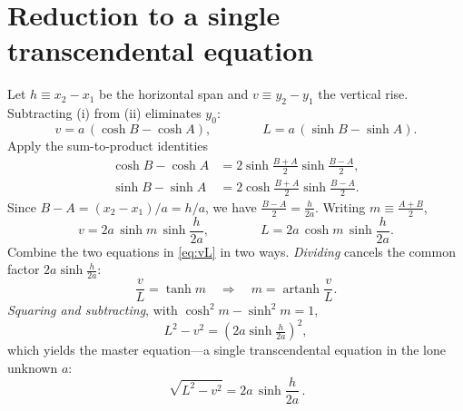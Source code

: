 \documentclass[11pt]{article}
\theoremstyle{remark}
\newcommand{\artanh}{\operatorname{artanh}}
\begin{document}
\section{Reduction to a single transcendental equation}
Let $h\equiv x_2-x_1$ be the horizontal span and $v\equiv y_2-y_1$ the vertical rise.
Subtracting (i) from (ii) eliminates $y_0$:
\begin{equation}
  v = a\,(\cosh B-\cosh A),\qquad\qquad
  L = a\,(\sinh B-\sinh A).
\end{equation}
Apply the sum-to-product identities
\begin{align}
  \cosh B-\cosh A &= 2\sinh\tfrac{B+A}{2}\sinh\tfrac{B-A}{2},\\
  \sinh B-\sinh A &= 2\cosh\tfrac{B+A}{2}\sinh\tfrac{B-A}{2}.
\end{align}
Since $B-A=(x_2-x_1)/a=h/a$, we have $\tfrac{B-A}{2}=\tfrac{h}{2a}$. Writing
$m\equiv\tfrac{A+B}{2}$,
\begin{equation}
  v = 2a\,\sinh m\,\sinh\frac{h}{2a},
  \qquad\qquad
  L = 2a\,\cosh m\,\sinh\frac{h}{2a}.
  \label{eq:vL}
\end{equation}
Combine the two equations in \eqref{eq:vL} in two ways. \emph{Dividing} cancels the
common factor $2a\sinh\frac{h}{2a}$:
\begin{equation}
  \frac{v}{L}=\tanh m
  \quad\Longrightarrow\quad
  m=\artanh\frac{v}{L}.
  \label{eq:m}
\end{equation}
\emph{Squaring and subtracting}, with $\cosh^2 m-\sinh^2 m=1$,
\begin{equation}
  L^2-v^2 = \left(2a\sinh\tfrac{h}{2a}\right)^2,
\end{equation}
which yields the master equation---a single transcendental equation in the lone
unknown $a$:
\begin{equation}
  \boxed{\,\sqrt{L^2-v^2} = 2a\,\sinh\frac{h}{2a}\,}.
  \label{eq:master}
\end{equation}

\end{document}
